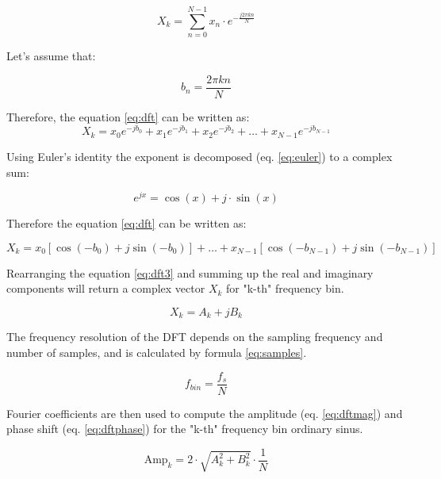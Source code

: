 \begin{equation} \label{eq:dft}
X_k = \sum_{n=0}^{N-1} x_n \cdot e^{-\frac{j2 \pi kn}{N}}
\end{equation}

Let's assume that:

\begin{equation} \label{eq:bn}
b_n = \frac{2 \pi k n}{N}
\end{equation}

Therefore, the equation \ref{eq:dft} can be written as:
\begin{equation} \label{eq:dft2}
X_k = x_{0} e^{-j b_{0}} + x_{1} e^{-j b_{1}} + x_{2} e^{-j b_{2}} + \ldots + x_{N-1} e^{-j b_{N-1}}
\end{equation}

Using Euler's identity the exponent is decomposed (eq. \ref{eq:euler}) to a complex sum:

\begin{equation} \label{eq:euler}
e^{jx} = \cos(x) + j \cdot \sin(x)
\end{equation}

Therefore the equation \ref{eq:dft} can be written as:

\begin{equation} \label{eq:dft3}
X_k = x_0 [\cos(-b_{0}) + j \sin(-b_{0})] +  \ldots + x_{N-1} [\cos(-b_{N-1}) + j \sin(-b_{N-1})]
\end{equation}

Rearranging the equation \ref{eq:dft3} and summing up the real and imaginary components will return a complex vector $X_k$ for "k-th" frequency bin.

\begin{equation} \label{eq:complex}
X_k = A_k + j B_{k}
\end{equation}
 
The frequency resolution of the DFT depends on the sampling frequency and number of samples, and is calculated by formula \ref{eq:samples}. 

\begin{equation} \label{eq:samples}
f_{bin} = \frac{f_{s}}{N}
\end{equation}

Fourier coefficients are then used to compute the amplitude (eq. \ref{eq:dftmag}) and phase shift (eq. \ref{eq:dftphase}) for the "k-th" frequency bin ordinary sinus.

\begin{equation} \label{eq:dftmag}
\text{Amp}_k = 2 \cdot \sqrt{A_{k}^{2} + B_{k}^{2}} \cdot \frac{1}{N}
\end{equation}

